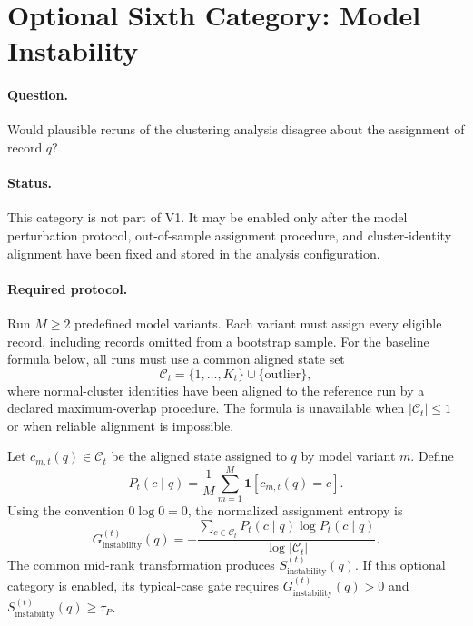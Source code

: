 \documentclass[11pt]{article}
\begin{document}
\section{Optional Sixth Category: Model Instability}

\paragraph{Question.}
Would plausible reruns of the clustering analysis disagree about the assignment
of record $q$?

\paragraph{Status.}
This category is not part of V1. It may be enabled only after the model
perturbation protocol, out-of-sample assignment procedure, and cluster-identity
alignment have been fixed and stored in the analysis configuration.

\paragraph{Required protocol.}
Run $M\geq 2$ predefined model variants. Each variant must assign every eligible
record, including records omitted from a bootstrap sample. For the baseline
formula below, all runs must use a common aligned state set
\begin{equation}
    \mathcal{C}_t
    =
    \{1,\ldots,K_t\}\cup\{\text{outlier}\},
\end{equation}
where normal-cluster identities have been aligned to the reference run by a
declared maximum-overlap procedure. The formula is unavailable when
$|\mathcal{C}_t|\leq 1$ or when reliable alignment is impossible.

Let $c_{m,t}(q)\in\mathcal{C}_t$ be the aligned state assigned to $q$ by model
variant $m$. Define
\begin{equation}
    P_t(c\mid q)
    =
    \frac{1}{M}
    \sum_{m=1}^{M}
    \mathbf{1}\!\left[c_{m,t}(q)=c\right].
\end{equation}
Using the convention $0\log 0=0$, the normalized assignment entropy is
\begin{equation}
    \boxed{
    G_{\mathrm{instability}}^{(t)}(q)
    =
    -\frac{
        \sum_{c\in\mathcal{C}_t}
        P_t(c\mid q)\log P_t(c\mid q)
    }{
        \log|\mathcal{C}_t|
    }
    }.
\end{equation}
The common mid-rank transformation produces
$S_{\mathrm{instability}}^{(t)}(q)$. If this optional category is enabled, its
typical-case gate requires $G_{\mathrm{instability}}^{(t)}(q)>0$ and
$S_{\mathrm{instability}}^{(t)}(q)\geq\tau_P$.
\end{document}
